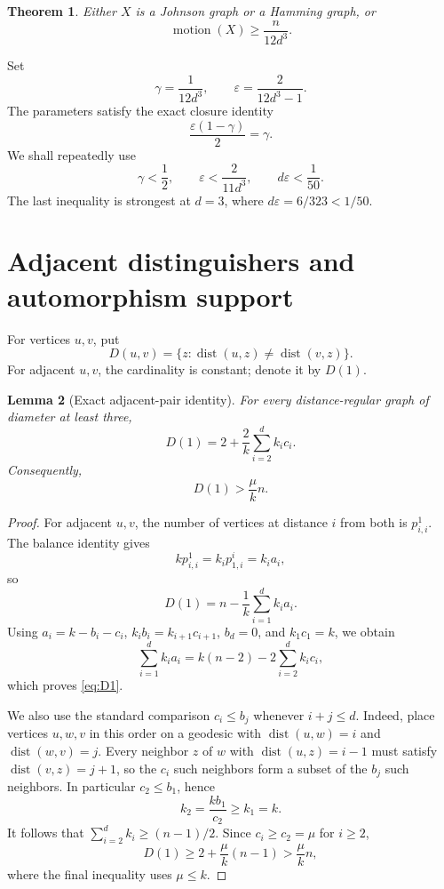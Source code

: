 \documentclass[11pt]{amsart}
\newtheorem{theorem}{Theorem}[section]
\newtheorem{lemma}[theorem]{Lemma}
\theoremstyle{definition}
\newcommand{\mot}{\operatorname{motion}}
\newcommand{\dist}{\operatorname{dist}}
\newcommand{\eps}{\varepsilon}
\newcommand{\gam}{\gamma}
\begin{document}
\begin{theorem}\label{thm:main}
Either $X$ is a Johnson graph or a Hamming graph, or
\begin{equation}\label{eq:main}
  \boxed{\mot(X)\ge \frac{n}{12d^3}.}
\end{equation}
\end{theorem}

Set
\begin{equation}\label{eq:parameters}
  \gam=\frac1{12d^3},\qquad
  \eps=\frac{2}{12d^3-1}.
\end{equation}
The parameters satisfy the exact closure identity
\begin{equation}\label{eq:closure}
  \frac{\eps(1-\gam)}2=\gam.
\end{equation}
We shall repeatedly use
\begin{equation}\label{eq:smallparameters}
  \gam<\frac12,\qquad
  \eps<\frac{2}{11d^3},\qquad
  d\eps<\frac1{50}.
\end{equation}
The last inequality is strongest at $d=3$, where $d\eps=6/323<1/50$.

\section{Adjacent distinguishers and automorphism support}
For vertices $u,v$, put
\[
  D(u,v)=\{z:\dist(u,z)\ne\dist(v,z)\}.
\]
For adjacent $u,v$, the cardinality is constant; denote it by $D(1)$.

\begin{lemma}[Exact adjacent-pair identity]\label{lem:D1}
For every distance-regular graph of diameter at least three,
\begin{equation}\label{eq:D1}
  D(1)=2+\frac2k\sum_{i=2}^{d} k_i c_i.
\end{equation}
Consequently,
\begin{equation}\label{eq:D1mu}
  D(1)>\frac{\mu}{k}n.
\end{equation}
\end{lemma}

\begin{proof}
For adjacent $u,v$, the number of vertices at distance $i$ from both is $p^1_{i,i}$.  The balance identity gives
\[
  kp^1_{i,i}=k_i p^i_{1,i}=k_i a_i,
\]
so
\[
  D(1)=n-\frac1k\sum_{i=1}^{d}k_i a_i.
\]
Using $a_i=k-b_i-c_i$, $k_i b_i=k_{i+1}c_{i+1}$, $b_d=0$, and $k_1c_1=k$, we obtain
\[
  \sum_{i=1}^{d}k_i a_i=k(n-2)-2\sum_{i=2}^{d}k_i c_i,
\]
which proves \eqref{eq:D1}.

We also use the standard comparison $c_i\le b_j$ whenever $i+j\le d$.  Indeed, place vertices $u,w,v$ in this order on a geodesic with $\dist(u,w)=i$ and $\dist(w,v)=j$.  Every neighbor $z$ of $w$ with $\dist(u,z)=i-1$ must satisfy $\dist(v,z)=j+1$, so the $c_i$ such neighbors form a subset of the $b_j$ such neighbors.  In particular $c_2\le b_1$, hence
\[
  k_2=\frac{kb_1}{c_2}\ge k_1=k.
\]
It follows that $\sum_{i=2}^{d}k_i\ge(n-1)/2$.  Since $c_i\ge c_2=\mu$ for $i\ge2$,
\[
  D(1)\ge 2+\frac{\mu}{k}(n-1)>\frac{\mu}{k}n,
\]
where the final inequality uses $\mu\le k$.
\end{proof}
\end{document}
